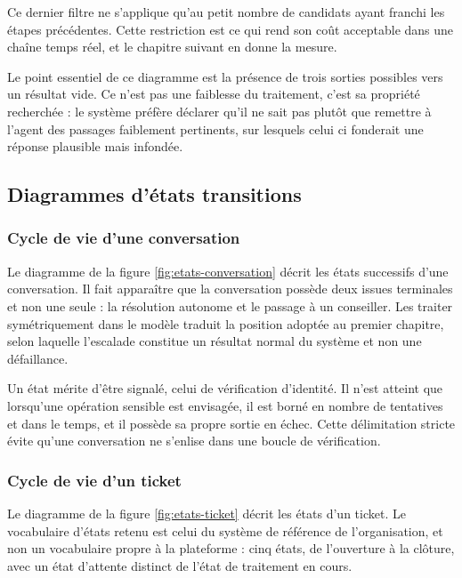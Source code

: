 Ce dernier filtre ne s'applique qu'au petit nombre de candidats ayant franchi les étapes précédentes. Cette restriction est ce qui rend son coût acceptable dans une chaîne temps réel, et le chapitre suivant en donne la mesure.

Le point essentiel de ce diagramme est la présence de trois sorties possibles vers un résultat vide. Ce n'est pas une faiblesse du traitement, c'est sa propriété recherchée : le système préfère déclarer qu'il ne sait pas plutôt que remettre à l'agent des passages faiblement pertinents, sur lesquels celui ci fonderait une réponse plausible mais infondée.


\subsection{Diagrammes d'états transitions}

\subsubsection{Cycle de vie d'une conversation}

Le diagramme de la figure \ref{fig:etats-conversation} décrit les états successifs d'une conversation. Il fait apparaître que la conversation possède deux issues terminales et non une seule : la résolution autonome et le passage à un conseiller. Les traiter symétriquement dans le modèle traduit la position adoptée au premier chapitre, selon laquelle l'escalade constitue un résultat normal du système et non une défaillance.

Un état mérite d'être signalé, celui de vérification d'identité. Il n'est atteint que lorsqu'une opération sensible est envisagée, il est borné en nombre de tentatives et dans le temps, et il possède sa propre sortie en échec. Cette délimitation stricte évite qu'une conversation ne s'enlise dans une boucle de vérification.


\subsubsection{Cycle de vie d'un ticket}

Le diagramme de la figure \ref{fig:etats-ticket} décrit les états d'un ticket. Le vocabulaire d'états retenu est celui du système de référence de l'organisation, et non un vocabulaire propre à la plateforme : cinq états, de l'ouverture à la clôture, avec un état d'attente distinct de l'état de traitement en cours.

